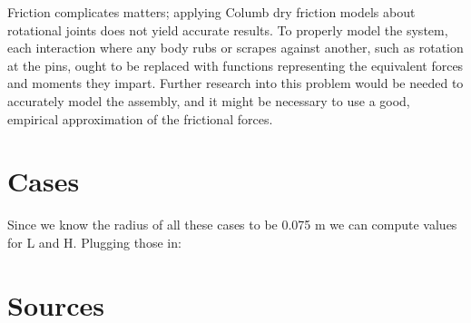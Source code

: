 \documentclass[nofoot,pdf-a,balance,colorlinks,upint,subscriptcorrection,varvw,mathalfa=cal=boondoxo]{asmeconf}
\begin{document}
    Friction complicates matters; applying Columb dry friction models about rotational joints does not yield accurate results. To properly model the system, each interaction where any body rubs or scrapes against another, such as rotation at the pins, ought to be replaced with functions representing the equivalent forces and moments they impart. Further research into this problem would be needed to accurately model the assembly, and it might be necessary to use a good, empirical approximation of the frictional forces.


    \appendix
    \section{Cases}\label{appendix:cases}
	  \begin{table}[H]
        \caption[Table]{Cases to consider (Given)}\label{tab:givenCases}
    \end{table}

	Since we know the radius of all these cases to be 0.075 m we can compute values for L and H. Plugging those in:
\begin{table}[H]
        \caption[Table]{Cases to consider (Absolute)}\label{tab:absCases}
    \end{table}


    

    

    \section{Sources}\label{appendix:sources} 
\end{document}
